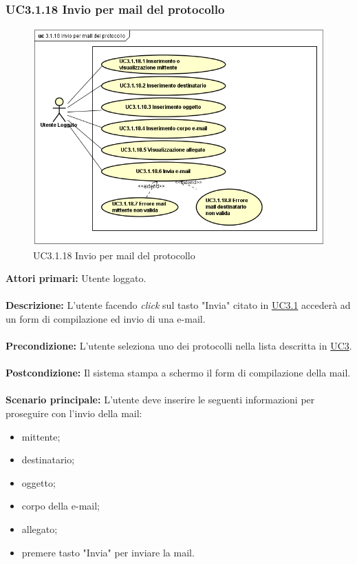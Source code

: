 \subsubsection{UC3.1.18 Invio per mail del protocollo}
    \label{UC3.1.18}
    \begin{figure}[!h] 
        \centering 
        \includegraphics[width = 15cm]{immagini/UseCase/inviomail.png}
        \caption{UC3.1.18 Invio per mail del protocollo}
    \end{figure}
    
    \textbf{Attori primari:} Utente loggato.
    \\ 
    \\
    \textbf{Descrizione:} L'utente facendo \textit{click} sul tasto "Invia" citato in \hyperref[UC3.1]{UC3.1} accederà ad un form di compilazione ed invio di una e-mail.
    \\
    \\
    \textbf{Precondizione:} L'utente seleziona uno dei protocolli nella lista descritta in \hyperref[UC3]{UC3}.
    \\
    \\
    \textbf{Postcondizione:} Il sistema stampa a schermo il form di compilazione della mail.
    \\
    \\
    \textbf{Scenario principale:} L'utente deve inserire le seguenti informazioni per proseguire con l'invio della mail:
            \begin{itemize}
                \item mittente;
                \item destinatario;
                \item oggetto;
                \item corpo della e-mail;
                \item allegato;
                \item premere tasto "Invia" per inviare la mail.
            \end{itemize}
            

